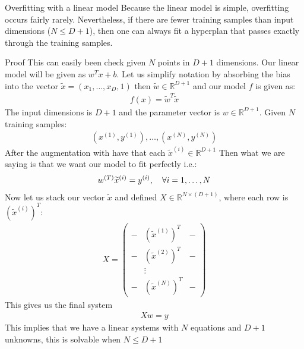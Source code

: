 \begin{parag}{Overfitting with a linear model}
    Because the linear model is simple, overfitting occurs fairly rarely. Nevertheless, if there are fewer training samples than input dimensions ($N \leq D  + 1$), then one can always fit a hyperplan that passes exactly through the training samples.
	\begin{subparag}{Proof}
	    This can easily been check given $N$ points in $D + 1$ dimensions. Our linear model will be given as $w^{T}x + b$. Let us simplify notation by absorbing the bias into the vector $\widetilde{x} = \left(x_1, \ldots, x_D, 1\right)$ then $\widetilde{w} \in \mathbb{R}^{D + 1}$ and our model $f$ is given as:
		\begin{align*} 
			f\left(x\right) = \widetilde{w}^{T}\widetilde{x}
		\end{align*}
		The input dimensions is $D + 1$ and the parameter vector is $w \in \mathbb{R}^{D + 1}$. Given $N$ training samples:
		\begin{align*} 
			\left(x^{\left(1\right)}, y^{\left(1\right)}\right), \ldots, \left(x^{\left(N\right)}, y^{\left(N\right)}\right)
		\end{align*}
		After the augmentation with have that each $\widetilde{x}^{\left(i\right)} \in \mathbb{R}^{D + 1}$ Then what we are saying is that we want our model to fit perfectly i.e.:
		\begin{align*} 
			w^{\left(T\right)}\widetilde{x}^{\left(i\right)} = y^{\left(i\right)}, \mathspace \forall i = 1, \ldots, N
		\end{align*}
		Now let us stack our vector $\widetilde{x}$ and defined $X \in \mathbb{R}^{N \times \left(D +1\right)}$, where each row is $\left(\widetilde{x}^{\left(i\right)}\right)^{T}$:
		\begin{align*} 
			X = \begin{pmatrix} - & \left(\widetilde{x}^{\left(1\right)}\right)^{T} & - \\ - & \left(\widetilde{x}^{\left(2\right)}\right)^{T} & - \\  & \vdots &  \\ - & \left(\widetilde{x}^{\left(N\right)}\right)^{T} & - \end{pmatrix} 
		\end{align*}
		This gives us the final system
		\begin{align*} 
			Xw = y
		\end{align*}
		This implies that we have a linear systems with $N$ equations and $D + 1$ unknowns, this is solvable when $N \leq D + 1$
	\end{subparag}
\end{parag}

